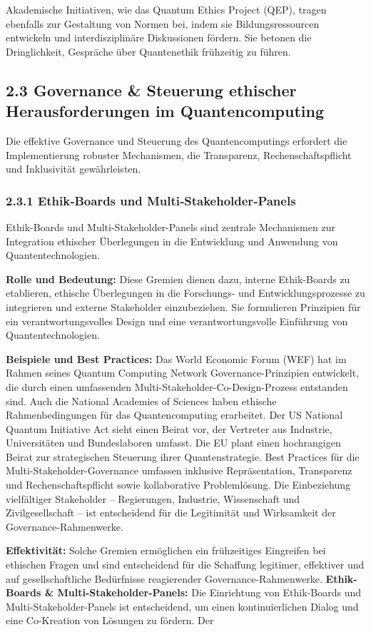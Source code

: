 Akademische Initiativen, wie das Quantum Ethics Project (QEP), tragen ebenfalls zur Gestaltung von Normen bei, indem sie Bildungsressourcen entwickeln und interdisziplinäre Diskussionen fördern. Sie betonen die Dringlichkeit, Gespräche über Quantenethik frühzeitig zu führen.

\subsection{2.3 Governance \& Steuerung ethischer Herausforderungen im Quantencomputing}
Die effektive Governance und Steuerung des Quantencomputings erfordert die Implementierung robuster Mechanismen, die Transparenz, Rechenschaftspflicht und Inklusivität gewährleisten.

\subsubsection{2.3.1 Ethik‑Boards und Multi‑Stakeholder‑Panels}
Ethik-Boards und Multi-Stakeholder-Panels sind zentrale Mechanismen zur Integration ethischer Überlegungen in die Entwicklung und Anwendung von Quantentechnologien.

    \item \textbf{Rolle und Bedeutung:} Diese Gremien dienen dazu, interne Ethik-Boards zu etablieren, ethische Überlegungen in die Forschungs- und Entwicklungsprozesse zu integrieren und externe Stakeholder einzubeziehen. Sie formulieren Prinzipien für ein verantwortungsvolles Design und eine verantwortungsvolle Einführung von Quantentechnologien.
    \item \textbf{Beispiele und Best Practices:} Das World Economic Forum (WEF) hat im Rahmen seines Quantum Computing Network Governance-Prinzipien entwickelt, die durch einen umfassenden Multi-Stakeholder-Co-Design-Prozess entstanden sind. Auch die National Academies of Sciences haben ethische Rahmenbedingungen für das Quantencomputing erarbeitet. Der US National Quantum Initiative Act sieht einen Beirat vor, der Vertreter aus Industrie, Universitäten und Bundeslaboren umfasst. Die EU plant einen hochrangigen Beirat zur strategischen Steuerung ihrer Quantenstrategie. Best Practices für die Multi-Stakeholder-Governance umfassen inklusive Repräsentation, Transparenz und Rechenschaftspflicht sowie kollaborative Problemlösung. Die Einbeziehung vielfältiger Stakeholder – Regierungen, Industrie, Wissenschaft und Zivilgesellschaft – ist entscheidend für die Legitimität und Wirksamkeit der Governance-Rahmenwerke.
    \item \textbf{Effektivität:} Solche Gremien ermöglichen ein frühzeitiges Eingreifen bei ethischen Fragen und sind entscheidend für die Schaffung legitimer, effektiver und auf gesellschaftliche Bedürfnisse reagierender Governance-Rahmenwerke.
    \textbf{Ethik-Boards \& Multi-Stakeholder-Panels:} Die Einrichtung von Ethik-Boards und Multi-Stakeholder-Panels ist entscheidend, um einen kontinuierlichen Dialog und eine Co-Kreation von Lösungen zu fördern. Der  

